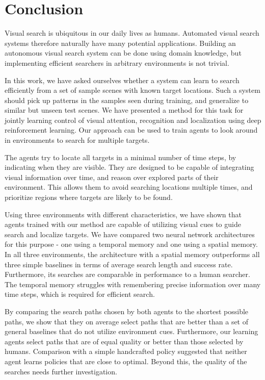 \chapter{Conclusion}
\label{cha:conclusion}

Visual search is ubiquitous in our daily lives as humans.
Automated visual search systems therefore naturally have many potential applications.
Building an autonomous visual search system can be done using domain knowledge, but implementing efficient searchers in arbitrary environments is not trivial.

In this work, we have asked ourselves whether a system can learn to search efficiently from a set of sample scenes with known target locations.
Such a system should pick up patterns in the samples seen during training, and generalize to similar but unseen test scenes.
We have presented a method for this task for jointly learning control of visual attention, recognition and localization using deep reinforcement learning.
Our approach can be used to train agents to look around in environments to search for multiple targets.

The agents try to locate all targets in a minimal number of time steps, by indicating when they are visible.
They are designed to be capable of integrating visual information over time, and reason over explored parts of their environment.
This allows them to avoid searching locations multiple times, and prioritize regions where targets are likely to be found.

Using three environments with different characteristics, we have shown that agents trained with our method are capable of utilizing visual cues to guide search and localize targets.
We have compared two neural network architectures for this purpose - one using a temporal memory and one using a spatial memory.
In all three environments, the architecture with a spatial memory outperforms all three simple baselines in terms of average search length and success rate.
Furthermore, its searches are comparable in performance to a human searcher.
The temporal memory struggles with remembering precise information over many time steps, which is required for efficient search.

By comparing the search paths chosen by both agents to the shortest possible paths, we show that they on average select paths that are better than a set of general baselines that do not utilize environment cues.
Furthermore, our learning agents select paths that are of equal quality or better than those selected by humans.
Comparison with a simple handcrafted policy suggested that neither agent learns policies that are close to optimal.
Beyond this, the quality of the searches needs further investigation.

